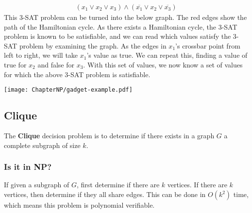         \begin{align*}
            (x_1 \lor x_2 \lor x_3) \land (\overline{x_1} \lor x_2 \lor \overline{x_3})
        \end{align*}
        This 3-SAT problem can be turned into the below graph. The red edges show the path of the Hamiltonian cycle. As there exists a Hamiltonian cycle, the 3-SAT problem is known to be satisfiable, and we can read which values satisfy the 3-SAT problem by examining the graph. As the edges in $x_1$'s crossbar point from left to right, we will take $x_1$'s value as true. We can repeat this, finding a value of true for $x_2$ and false for $x_3$. With this set of values, we now know a set of values for which the above 3-SAT problem is satisfiable.
        \begin{center}
            \texttt{[image: ChapterNP/gadget-example.pdf]}
        \end{center}

\subsection{Clique}
    The \textbf{Clique} decision problem is to determine if there exists in a graph $G$ a complete subgraph of size $k$.
    \subsubsection{Is it in NP?}
        If given a subgraph of $G$, first determine if there are $k$ vertices. If there are $k$ vertices, then determine if they all share edges. This can be done in $O(k^2)$ time, which means this problem is polynomial verifiable.
